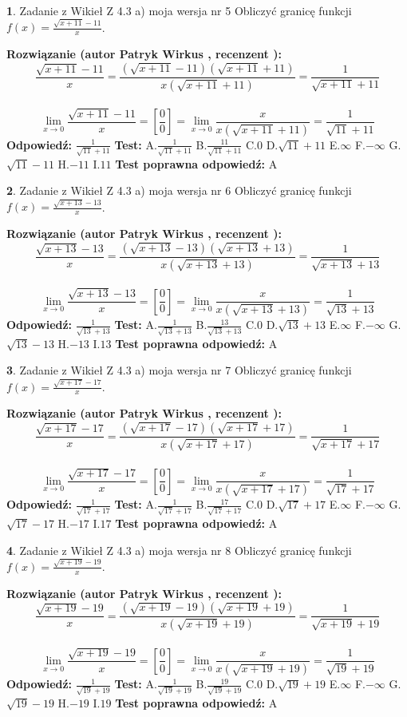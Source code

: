 \documentclass[12pt, a4paper]{article}
\theoremstyle{definition} %
\newtheorem{zad}{}
\newcommand{\zadStart}[1]{\begin{zad}#1\newline}
\newcommand{\zadStop}{\end{zad}}
\newcommand{\rozwStart}[2]{\noindent \textbf{Rozwiązanie (autor #1 , recenzent #2): }\newline}
\newcommand{\rozwStop}{\newline}
\newcommand{\odpStart}{\noindent \textbf{Odpowiedź:}\newline}
\newcommand{\odpStop}{\newline}
\newcommand{\testStart}{\noindent \textbf{Test:}\newline}
\newcommand{\testStop}{\newline}
\newcommand{\kluczStart}{\noindent \textbf{Test poprawna odpowiedź:}\newline}
\newcommand{\kluczStop}{\newline}
\begin{document}
\zadStart{Zadanie z Wikieł Z 4.3 a) moja wersja nr 5}
Obliczyć granicę funkcji $f(x)=\frac{\sqrt{x+11}-11}{x}$.
\zadStop
\rozwStart{Patryk Wirkus}{}
$$\frac{\sqrt{x+11}-11}{x}=\frac{(\sqrt{x+11}-11)(\sqrt{x+11}+11)}{x(\sqrt{x+11}+11)}=\frac{1}{\sqrt{x+11}+11}$$
\\
$$\lim\limits_{x\to0}\frac{\sqrt{x+11}-11}{x}=[\frac{0}{0}]=
\lim\limits_{x\to0}\frac{x}{x(\sqrt{x+11}+11)} = \frac{1}{\sqrt{11}+11}$$
\rozwStop
\odpStart
$\frac{1}{\sqrt{11}+11}$
\odpStop
\testStart
A.$\frac{1}{\sqrt{11}+11}$
B.$\frac{11}{\sqrt{11}+11}$
C.$0$
D.$\sqrt{11}+11$
E.$\infty$
F.$-\infty$
G.$\sqrt{11}-11$
H.$-11$
I.$11$
\testStop
\kluczStart
A
\kluczStop



\zadStart{Zadanie z Wikieł Z 4.3 a) moja wersja nr 6}
Obliczyć granicę funkcji $f(x)=\frac{\sqrt{x+13}-13}{x}$.
\zadStop
\rozwStart{Patryk Wirkus}{}
$$\frac{\sqrt{x+13}-13}{x}=\frac{(\sqrt{x+13}-13)(\sqrt{x+13}+13)}{x(\sqrt{x+13}+13)}=\frac{1}{\sqrt{x+13}+13}$$
\\
$$\lim\limits_{x\to0}\frac{\sqrt{x+13}-13}{x}=[\frac{0}{0}]=
\lim\limits_{x\to0}\frac{x}{x(\sqrt{x+13}+13)} = \frac{1}{\sqrt{13}+13}$$
\rozwStop
\odpStart
$\frac{1}{\sqrt{13}+13}$
\odpStop
\testStart
A.$\frac{1}{\sqrt{13}+13}$
B.$\frac{13}{\sqrt{13}+13}$
C.$0$
D.$\sqrt{13}+13$
E.$\infty$
F.$-\infty$
G.$\sqrt{13}-13$
H.$-13$
I.$13$
\testStop
\kluczStart
A
\kluczStop



\zadStart{Zadanie z Wikieł Z 4.3 a) moja wersja nr 7}
Obliczyć granicę funkcji $f(x)=\frac{\sqrt{x+17}-17}{x}$.
\zadStop
\rozwStart{Patryk Wirkus}{}
$$\frac{\sqrt{x+17}-17}{x}=\frac{(\sqrt{x+17}-17)(\sqrt{x+17}+17)}{x(\sqrt{x+17}+17)}=\frac{1}{\sqrt{x+17}+17}$$
\\
$$\lim\limits_{x\to0}\frac{\sqrt{x+17}-17}{x}=[\frac{0}{0}]=
\lim\limits_{x\to0}\frac{x}{x(\sqrt{x+17}+17)} = \frac{1}{\sqrt{17}+17}$$
\rozwStop
\odpStart
$\frac{1}{\sqrt{17}+17}$
\odpStop
\testStart
A.$\frac{1}{\sqrt{17}+17}$
B.$\frac{17}{\sqrt{17}+17}$
C.$0$
D.$\sqrt{17}+17$
E.$\infty$
F.$-\infty$
G.$\sqrt{17}-17$
H.$-17$
I.$17$
\testStop
\kluczStart
A
\kluczStop



\zadStart{Zadanie z Wikieł Z 4.3 a) moja wersja nr 8}
Obliczyć granicę funkcji $f(x)=\frac{\sqrt{x+19}-19}{x}$.
\zadStop
\rozwStart{Patryk Wirkus}{}
$$\frac{\sqrt{x+19}-19}{x}=\frac{(\sqrt{x+19}-19)(\sqrt{x+19}+19)}{x(\sqrt{x+19}+19)}=\frac{1}{\sqrt{x+19}+19}$$
\\
$$\lim\limits_{x\to0}\frac{\sqrt{x+19}-19}{x}=[\frac{0}{0}]=
\lim\limits_{x\to0}\frac{x}{x(\sqrt{x+19}+19)} = \frac{1}{\sqrt{19}+19}$$
\rozwStop
\odpStart
$\frac{1}{\sqrt{19}+19}$
\odpStop
\testStart
A.$\frac{1}{\sqrt{19}+19}$
B.$\frac{19}{\sqrt{19}+19}$
C.$0$
D.$\sqrt{19}+19$
E.$\infty$
F.$-\infty$
G.$\sqrt{19}-19$
H.$-19$
I.$19$
\testStop
\kluczStart
A
\kluczStop
\end{document}
